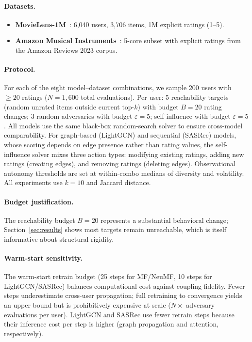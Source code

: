 \documentclass[sigconf,anonymous]{acmart}
\begin{document}
\paragraph{Datasets.}
\begin{itemize}
    \item \textbf{MovieLens-1M}~\cite{harper2015movielens}: 6,040 users, 3,706 items, 1M explicit ratings (1--5).
    \item \textbf{Amazon Musical Instruments}~\cite{mcauley2015image}: 5-core subset with explicit ratings from the Amazon Reviews 2023 corpus.
\end{itemize}

\paragraph{Protocol.}
For each of the eight model--dataset combinations, we sample 200 users with $\geq 20$ ratings ($N = 1{,}600$ total evaluations). Per user: 5 reachability targets (random unrated items outside current top-$k$) with budget $B = 20$ rating changes; 3 random adversaries with budget $\varepsilon = 5$; self-influence with budget $\varepsilon = 5$. All models use the same black-box random-search solver to ensure cross-model comparability. For graph-based (LightGCN) and sequential (SASRec) models, whose scoring depends on edge presence rather than rating values, the self-influence solver mixes three action types: modifying existing ratings, adding new ratings (creating edges), and removing ratings (deleting edges). Observational autonomy thresholds are set at within-combo medians of diversity and volatility. All experiments use $k = 10$ and Jaccard distance.

\paragraph{Budget justification.}
The reachability budget $B = 20$ represents a substantial behavioral change; Section~\ref{sec:results} shows most targets remain unreachable, which is itself informative about structural rigidity.

\paragraph{Warm-start sensitivity.}
The warm-start retrain budget (25 steps for MF/NeuMF, 10 steps for LightGCN/SASRec) balances computational cost against coupling fidelity. Fewer steps underestimate cross-user propagation; full retraining to convergence yields an upper bound but is prohibitively expensive at scale ($N \times$ adversary evaluations per user). LightGCN and SASRec use fewer retrain steps because their inference cost per step is higher (graph propagation and attention, respectively).
\end{document}
